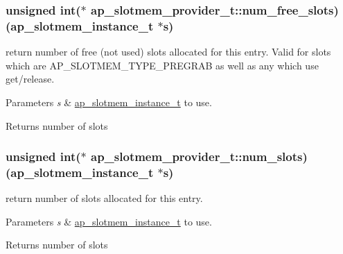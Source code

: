 \subsubsection[{\texorpdfstring{num\+\_\+free\+\_\+slots}{num_free_slots}}]{\setlength{\rightskip}{0pt plus 5cm}unsigned {\bf int}($\ast$  ap\+\_\+slotmem\+\_\+provider\+\_\+t\+::num\+\_\+free\+\_\+slots) ({\bf ap\+\_\+slotmem\+\_\+instance\+\_\+t} $\ast${\bf s})}\hypertarget{structap__slotmem__provider__t_ac1798d108e154b4be102e6df5d5b97b4}{}\label{structap__slotmem__provider__t_ac1798d108e154b4be102e6df5d5b97b4}
return number of free (not used) slots allocated for this entry. Valid for slots which are A\+P\+\_\+\+S\+L\+O\+T\+M\+E\+M\+\_\+\+T\+Y\+P\+E\+\_\+\+P\+R\+E\+G\+R\+AB as well as any which use get/release. 
\begin{DoxyParams}{Parameters}
{\em s} & \hyperlink{structap__slotmem__instance__t}{ap\+\_\+slotmem\+\_\+instance\+\_\+t} to use. \\
\hline
\end{DoxyParams}
\begin{DoxyReturn}{Returns}
number of slots 
\end{DoxyReturn}
\subsubsection[{\texorpdfstring{num\+\_\+slots}{num_slots}}]{\setlength{\rightskip}{0pt plus 5cm}unsigned {\bf int}($\ast$  ap\+\_\+slotmem\+\_\+provider\+\_\+t\+::num\+\_\+slots) ({\bf ap\+\_\+slotmem\+\_\+instance\+\_\+t} $\ast${\bf s})}\hypertarget{structap__slotmem__provider__t_ab6ef040311cb142505aaa57793e1c23b}{}\label{structap__slotmem__provider__t_ab6ef040311cb142505aaa57793e1c23b}
return number of slots allocated for this entry. 
\begin{DoxyParams}{Parameters}
{\em s} & \hyperlink{structap__slotmem__instance__t}{ap\+\_\+slotmem\+\_\+instance\+\_\+t} to use. \\
\hline
\end{DoxyParams}
\begin{DoxyReturn}{Returns}
number of slots 
\end{DoxyReturn}
